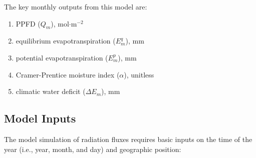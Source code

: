 The key monthly outputs from this model are:
\begin{enumerate}
	\item PPFD ($Q_m$), mol$\cdot$m$^{-2}$
	\item equilibrium evapotranspiration ($E_m^q$), mm
	\item potential evapotranspiration ($E_m^p$), mm
	\item Cramer-Prentice moisture index ($\alpha$), unitless
	\item climatic water deficit ($\Delta E_m$), mm
\end{enumerate}


\subsection{Model Inputs}
\label{sec:inputs}
The model simulation of radiation fluxes requires basic inputs on the time of the year (i.e., year, month, and day) and geographic position:

